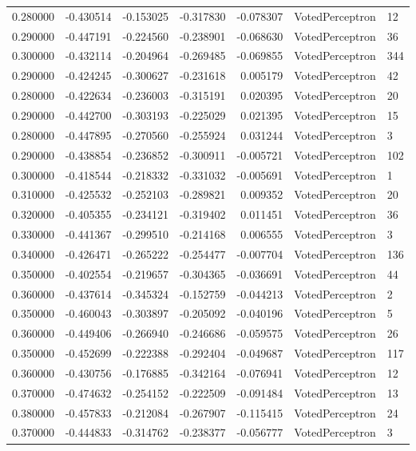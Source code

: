 \begin{tabular}{rrrrrll}
0.280000 & -0.430514 & -0.153025 & -0.317830 & -0.078307 & VotedPerceptron & 12 \\
0.290000 & -0.447191 & -0.224560 & -0.238901 & -0.068630 & VotedPerceptron & 36 \\
0.300000 & -0.432114 & -0.204964 & -0.269485 & -0.069855 & VotedPerceptron & 344 \\
0.290000 & -0.424245 & -0.300627 & -0.231618 & 0.005179 & VotedPerceptron & 42 \\
0.280000 & -0.422634 & -0.236003 & -0.315191 & 0.020395 & VotedPerceptron & 20 \\
0.290000 & -0.442700 & -0.303193 & -0.225029 & 0.021395 & VotedPerceptron & 15 \\
0.280000 & -0.447895 & -0.270560 & -0.255924 & 0.031244 & VotedPerceptron & 3 \\
0.290000 & -0.438854 & -0.236852 & -0.300911 & -0.005721 & VotedPerceptron & 102 \\
0.300000 & -0.418544 & -0.218332 & -0.331032 & -0.005691 & VotedPerceptron & 1 \\
0.310000 & -0.425532 & -0.252103 & -0.289821 & 0.009352 & VotedPerceptron & 20 \\
0.320000 & -0.405355 & -0.234121 & -0.319402 & 0.011451 & VotedPerceptron & 36 \\
0.330000 & -0.441367 & -0.299510 & -0.214168 & 0.006555 & VotedPerceptron & 3 \\
0.340000 & -0.426471 & -0.265222 & -0.254477 & -0.007704 & VotedPerceptron & 136 \\
0.350000 & -0.402554 & -0.219657 & -0.304365 & -0.036691 & VotedPerceptron & 44 \\
0.360000 & -0.437614 & -0.345324 & -0.152759 & -0.044213 & VotedPerceptron & 2 \\
0.350000 & -0.460043 & -0.303897 & -0.205092 & -0.040196 & VotedPerceptron & 5 \\
0.360000 & -0.449406 & -0.266940 & -0.246686 & -0.059575 & VotedPerceptron & 26 \\
0.350000 & -0.452699 & -0.222388 & -0.292404 & -0.049687 & VotedPerceptron & 117 \\
0.360000 & -0.430756 & -0.176885 & -0.342164 & -0.076941 & VotedPerceptron & 12 \\
0.370000 & -0.474632 & -0.254152 & -0.222509 & -0.091484 & VotedPerceptron & 13 \\
0.380000 & -0.457833 & -0.212084 & -0.267907 & -0.115415 & VotedPerceptron & 24 \\
0.370000 & -0.444833 & -0.314762 & -0.238377 & -0.056777 & VotedPerceptron & 3 \\

\end{tabular}
